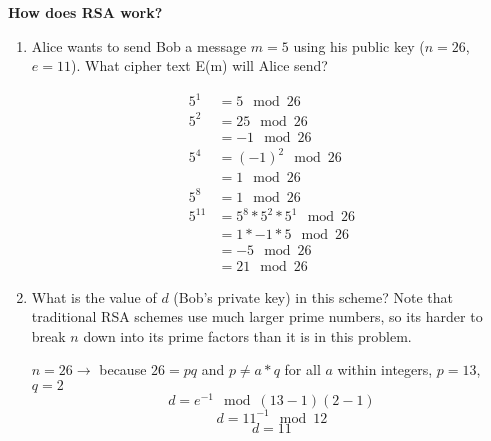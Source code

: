 \question \textbf{How does RSA work?}
\begin{enumerate}[label=\alph*.]
\item Alice wants to send Bob a message $m = 5$ using his public
key ($n = 26$, $e = 11$). What cipher text E(m) will Alice send?

\begin{solution}[1 in]
\begin{align*}
5^1 &= 5 \mod 26 \\
5^2 &= 25 \mod 26 \\
&= -1 \mod 26\\
5^4 &= (-1)^2 \mod 26 \\
&= 1 \mod 26\\
5^8 &= 1 \mod 26 \\
5^{11} &= 5^8  * 5^2 * 5^1 \mod 26 \\
&= 1 * -1 * 5 \mod 26 \\
&= -5 \mod 26\\
&= 21 \mod 26
\end{align*}
\end{solution}

\item What is the value of $d$ (Bob’s private key) in this scheme?
Note that traditional RSA schemes use much larger prime numbers,
so its harder to break $n$ down into its prime factors than it is in
this problem.

\begin{solution}
$n=26  \rightarrow$ because $26 = pq$ and $p\neq a*q$ for all $a$
within integers, $p=13$, $q=2$
\[d = e^{-1} \mod (13-1)(2-1)\]
\[d = 11^{-1} \mod 12\]
\[d = 11\]
\end{solution}
\end{enumerate}

\clearpage
